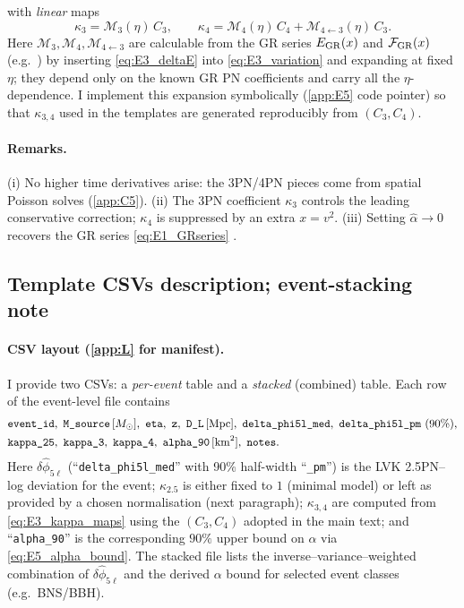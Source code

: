 \documentclass{iopjournal}
\begin{document}
with \emph{linear} maps
\begin{equation}
\kappa_{3}=\mathcal M_{3}(\eta)\,C_{3},\qquad
\kappa_{4}=\mathcal M_{4}(\eta)\,C_{4}+\mathcal M_{4\leftarrow 3}(\eta)\,C_{3}.
\label{eq:E3_kappa_maps}
\end{equation}
Here $\mathcal M_{3},\mathcal M_{4},\mathcal M_{4\leftarrow 3}$ are calculable from the GR series $E_{\rm GR}(x)$ and $\mathcal F_{\rm GR}(x)$ (e.g.\ \cite{Blanchet2014LRR,PoissonWill2014,MaggioreGW}) by inserting \eqref{eq:E3_deltaE} into \eqref{eq:E3_variation} and expanding at fixed $\eta$; they depend only on the known GR PN coefficients and carry all the $\eta$-dependence. I implement this expansion symbolically (\cref{app:E5} code pointer) so that $\kappa_{3,4}$ used in the templates are generated reproducibly from $(C_{3},C_{4})$.

\paragraph{Remarks.}
(i) No higher time derivatives arise: the 3PN/4PN pieces come from spatial Poisson solves (\cref{app:C5}). (ii) The 3PN coefficient $\kappa_{3}$ controls the leading conservative correction; $\kappa_{4}$ is suppressed by an extra $x=v^{2}$. (iii) Setting $\widehat\alpha\to0$ recovers the GR series \eqref{eq:E1_GRseries} \cite{Blanchet2014LRR}.

\subsection{Template CSVs description; event-stacking note}\label{app:E4}
\paragraph{CSV layout (\cref{app:L} for manifest).}
I provide two CSVs: a \emph{per-event} table and a \emph{stacked} (combined) table. Each row of the event-level file contains
\[
\begin{aligned}
&\texttt{event\_id},\ \texttt{M\_source}\,[M_\odot],\ \texttt{eta},\ \texttt{z},\ \texttt{D\_L}\,[{\rm Mpc}],\
\texttt{delta\_phi5l\_med},\ \texttt{delta\_phi5l\_pm}\ (90\%),\\
&\texttt{kappa\_25},\
\texttt{kappa\_3},\ \texttt{kappa\_4},\
\texttt{alpha\_90}\,[{\rm km}^2],\ \texttt{notes}.
\end{aligned}
\]
Here \(\delta\hat\phi_{5\ell}\) (``\texttt{delta\_phi5l\_med}'' with 90\% half-width ``\texttt{\_pm}'') is the LVK 2.5PN–log deviation for the event; \(\kappa_{2.5}\) is either fixed to $1$ (minimal model) or left as provided by a chosen normalisation (next paragraph); \(\kappa_{3,4}\) are computed from \eqref{eq:E3_kappa_maps} using the $(C_{3},C_{4})$ adopted in the main text; and ``\texttt{alpha\_90}'' is the corresponding $90\%$ upper bound on $\alpha$ via \eqref{eq:E5_alpha_bound}. The stacked file lists the inverse–variance–weighted combination of $\delta\hat\phi_{5\ell}$ and the derived $\alpha$ bound for selected event classes (e.g.\ BNS/BBH).
\end{document}
